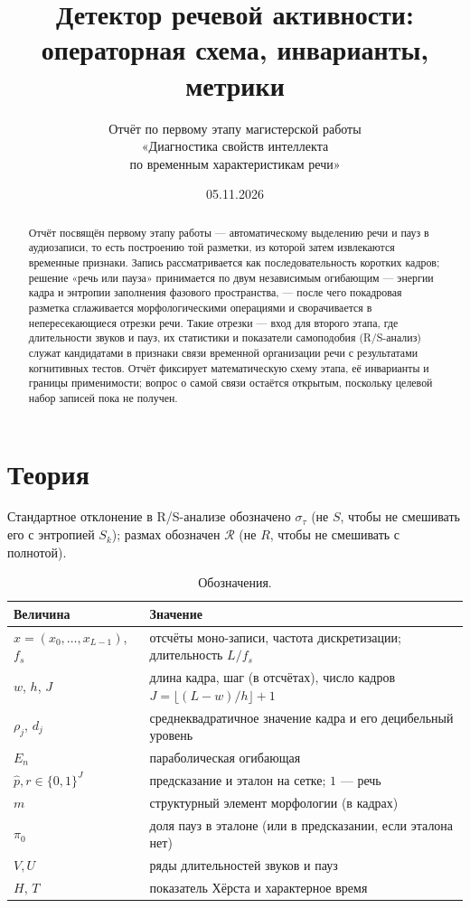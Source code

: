 \documentclass[11pt,a4paper]{article}
\title{\bfseries Детектор речевой активности:\\
операторная схема, инварианты, метрики}
\author{\large Отчёт по первому этапу магистерской работы\\
«Диагностика свойств интеллекта\\
по временным характеристикам речи»}
\date{05.11.2026}
\theoremstyle{definition}
\theoremstyle{plain}
\begin{document}
\sloppy
\maketitle

\begin{abstract}
\noindent
Отчёт посвящён первому этапу работы --- автоматическому выделению речи и пауз в
аудиозаписи, то есть построению той разметки, из которой затем извлекаются
временные признаки. Запись рассматривается как последовательность коротких
кадров; решение «речь или пауза» принимается по двум независимым огибающим ---
энергии кадра и энтропии заполнения фазового пространства, --- после чего
покадровая разметка сглаживается морфологическими операциями и сворачивается в
непересекающиеся отрезки речи. Такие отрезки --- вход для второго этапа, где
длительности звуков и пауз, их статистики и показатели самоподобия (R/S-анализ)
служат кандидатами в признаки связи временной организации речи с результатами
когнитивных тестов. Отчёт фиксирует математическую схему этапа, её инварианты и
границы применимости; вопрос о самой связи остаётся открытым, поскольку целевой
набор записей пока не получен.
\end{abstract}

\tableofcontents
\bigskip

\section{Теория}
Стандартное отклонение в R/S-анализе обозначено $\sigma_\tau$ (не $S$, чтобы не
смешивать его с энтропией $S_k$); размах обозначен $\mathcal R$ (не $R$, чтобы
не смешивать с полнотой).

\begin{table}[h]\centering\small
\caption{Обозначения.}\label{tab:notation}
\begin{tabular}{@{}p{3.1cm}p{10.6cm}@{}}
\toprule
Величина & Значение \\
\midrule
$x=(x_0,\dots,x_{L-1})$, $f_s$ & отсчёты моно-записи, частота дискретизации;
длительность $L/f_s$ \\
$w$, $h$, $J$ & длина кадра, шаг (в отсчётах), число кадров
$J=\lfloor (L-w)/h\rfloor+1$ \\
$\rho_j$, $d_j$ & среднеквадратичное значение кадра и его децибельный уровень \\
$E_n$ & параболическая огибающая \\
$\hat p,r\in\{0,1\}^J$ & предсказание и эталон на сетке; $1$ --- речь \\
$m$ & структурный элемент морфологии (в кадрах) \\
$\pi_0$ & доля пауз в эталоне (или в предсказании, если эталона нет) \\
$V,U$ & ряды длительностей звуков и пауз \\
$H$, $T$ & показатель Хёрста и характерное время \\
\bottomrule
\end{tabular}
\end{table}
\end{document}
